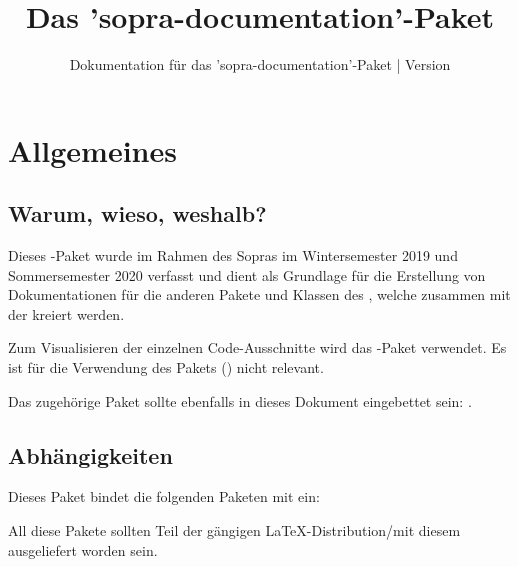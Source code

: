\documentclass{sopra-base}
\title{Das 'sopra-documentation'-Paket}
\subtitle[Dokumentation für das 'sopra-documentation'-Paket]{Dokumentation für das 'sopra-documentation'-Paket | Version \thesodversion}
\begin{document}
    \maketitle%
%
%

%
%
%
%

\section{Allgemeines}
\subsection{Warum, wieso, weshalb?}
    Dieses \LaTeXe-Paket wurde im Rahmen des Sopras im
    Wintersemester 2019 und Sommersemester 2020 verfasst und dient als
    Grundlage für die Erstellung von Dokumentationen für die anderen Pakete und Klassen
    des , welche zusammen mit der  kreiert
    werden.\par
    Zum Visualisieren der einzelnen Code-Ausschnitte wird das
    -Paket verwendet. Es ist für die Verwendung des Pakets ()
    nicht relevant.\par
    Das zugehörige Paket sollte ebenfalls in dieses Dokument eingebettet sein: .
\subsection{Abhängigkeiten}
    Dieses Paket bindet die folgenden Paketen mit ein:
    \begin{multicols}{3}
    \end{multicols}
    All diese Pakete sollten Teil der gängigen \LaTeX-Distribution/mit diesem ausgeliefert worden sein.
\end{document}
